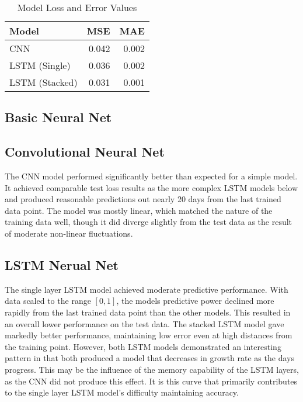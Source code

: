﻿\documentclass{article}
\begin{document}
\begin{table}[h!]
  \begin{tabular}{l | r | r }
    
    Model & MSE & MAE \\
    \hline
    CNN & 0.042 & 0.002 \\
    
    LSTM (Single) & 0.036 & 0.002 \\
    
    LSTM (Stacked) & 0.031 & 0.001
                               
  \end{tabular}
  \caption{Model Loss and Error Values}
  \label{table:1}
  \end{table}
\begin{multicols}{2}
\subsection*{Basic Neural Net}

\subsection*{Convolutional Neural Net}

The CNN model performed significantly better than expected for a simple model.
It achieved comparable test loss results as the more complex LSTM models below
and produced reasonable predictions out nearly 20 days from the last trained
data point. The model was mostly linear, which matched the nature of the
training data well, though it did diverge slightly from the test data as the
result of moderate non-linear fluctuations.

\subsection*{LSTM Nerual Net}

The single layer LSTM model achieved moderate predictive performance.
With data scaled to the range $[0, 1]$, the models predictive power declined
more rapidly from the last trained data point than the other models.
This resulted in an overall lower performance on the test data.
The stacked LSTM model gave markedly better performance,
maintaining low error even at high distances from the training point.
However, both LSTM models demonstrated an interesting pattern in that both
produced a model that decreases in growth rate as the days progress.
This may be the influence of the memory capability of the LSTM layers,
as the CNN did not produce this effect. It is this curve that primarily
contributes to the single layer LSTM model's difficulty maintaining accuracy.


\end{multicols}
\end{document}
